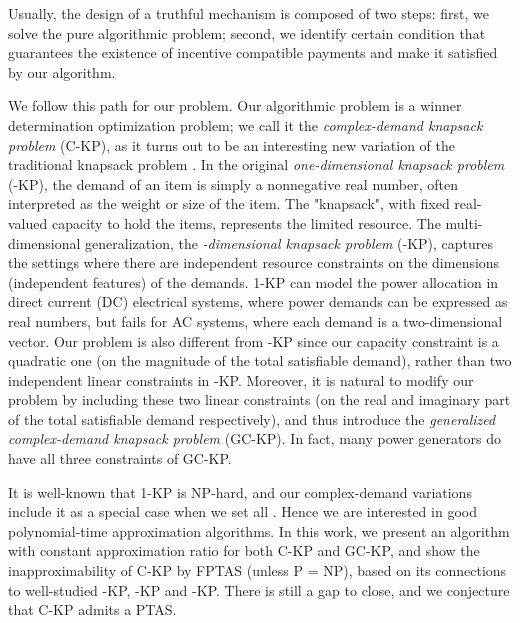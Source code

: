 \documentclass{aamas2013}
\begin{document}
Usually, the design of a truthful mechanism is composed of two steps: first, we solve the pure algorithmic problem; second, we identify certain condition that guarantees the existence of incentive compatible payments and make it satisfied by our algorithm.  

We follow this path for our problem.  Our algorithmic problem is a winner determination optimization problem; we call it the {\em complex-demand knapsack problem} ({\sc C-KP}), as it turns out to be an interesting new variation of the traditional knapsack problem \cite{KPP10book}.  In the original {\em one-dimensional knapsack problem} ({-KP}), the demand of an item is simply a nonnegative real number, often interpreted as the weight or size of the item.  The "knapsack", with fixed real-valued capacity to hold the items, represents the limited resource.  The multi-dimensional generalization, the {\em -dimensional knapsack problem} ({\sc -KP}), captures the settings where there are  independent resource constraints on the  dimensions (independent features) of the demands.  1-KP can model the power allocation in direct current (DC) electrical systems, where power demands can be expressed as real numbers, but fails for AC systems, where each demand is a two-dimensional vector.  Our problem is also different from {-KP} since our capacity constraint is a quadratic one (on the magnitude of the total satisfiable demand), rather than two independent linear constraints in {-KP}.  Moreover, it is natural to modify our problem by including these two linear constraints (on the real and imaginary part of the total satisfiable demand respectively), and thus introduce the {\em generalized complex-demand knapsack problem} ({\sc GC-KP}).  In fact, many power generators do have all three constraints of GC-KP.     

It is well-known that 1-KP is NP-hard, and our complex-demand variations include it as a special case when we set all .  
Hence we are interested in good polynomial-time approximation algorithms.  In this work, we present an algorithm with constant  approximation ratio for both {\sc C-KP} and {\sc GC-KP}, and show the inapproximability of {\sc C-KP} by FPTAS (unless P = NP), based on its connections to well-studied {-KP}, {-KP} and {-KP}.  There is still a gap to close, and we conjecture that {\sc C-KP} admits a PTAS.



 
\end{document}
